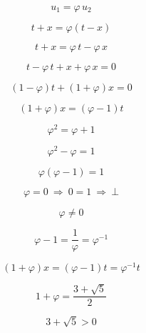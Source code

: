 \documentclass[12pt]{article}
\begin{document}
\begin{equation}
\boxed{
u_1=\varphi\,u_2
}
\end{equation}

\begin{equation}
t+x=\varphi(t-x)
\end{equation}

\begin{equation}
t+x=\varphi\,t-\varphi\,x
\end{equation}

\begin{equation}
t-\varphi\,t+x+\varphi\,x=0
\end{equation}

\begin{equation}
(1-\varphi)t+(1+\varphi)x=0
\end{equation}

\begin{equation}
(1+\varphi)x=(\varphi-1)t
\end{equation}

\begin{equation}
\varphi^2=\varphi+1
\end{equation}

\begin{equation}
\varphi^2-\varphi=1
\end{equation}

\begin{equation}
\varphi(\varphi-1)=1
\end{equation}

\begin{equation}
\varphi=0\ \Longrightarrow\ 0=1\ \Longrightarrow\ \bot
\end{equation}

\begin{equation}
\varphi\neq 0
\end{equation}

\begin{equation}
\varphi-1=\frac{1}{\varphi}=\varphi^{-1}
\end{equation}

\begin{equation}
(1+\varphi)x=(\varphi-1)t=\varphi^{-1}t
\end{equation}

\begin{equation}
1+\varphi=\frac{3+\sqrt{5}}{2}
\end{equation}

\begin{equation}
3+\sqrt{5}>0
\end{equation}
\end{document}
